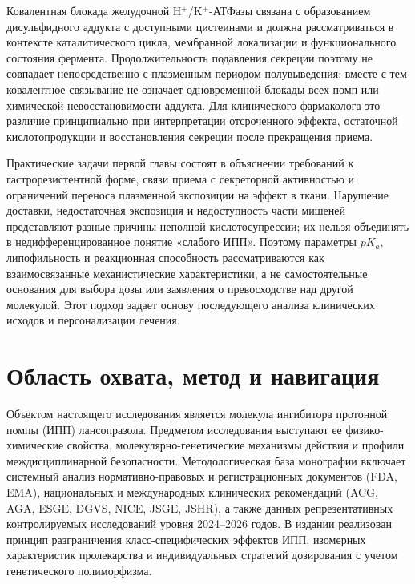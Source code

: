 \documentclass[11pt,a4paper,notitlepage]{report}
\newcommand{\src}[1]{\unskip\space\cite{#1}}
\begin{document}
Ковалентная блокада желудочной H$^+$/K$^+$-АТФазы связана с образованием дисульфидного аддукта с доступными цистеинами и должна рассматриваться в контексте каталитического цикла, мембранной локализации и функционального состояния фермента. Продолжительность подавления секреции поэтому не совпадает непосредственно с плазменным периодом полувыведения; вместе с тем ковалентное связывание не означает одновременной блокады всех помп или химической невосстановимости аддукта. Для клинического фармаколога это различие принципиально при интерпретации отсроченного эффекта, остаточной кислотопродукции и восстановления секреции после прекращения приема.\src{molstructure,molcys,molrestore,uslabel}

Практические задачи первой главы состоят в объяснении требований к гастрорезистентной форме, связи приема с секреторной активностью и ограничений переноса плазменной экспозиции на эффект в ткани. Нарушение доставки, недостаточная экспозиция и недоступность части мишеней представляют разные причины неполной кислотосупрессии; их нельзя объединять в недифференцированное понятие «слабого ИПП». Поэтому параметры $pK_a$, липофильность и реакционная способность рассматриваются как взаимосвязанные механистические характеристики, а не самостоятельные основания для выбора дозы или заявления о превосходстве над другой молекулой. Этот подход задает основу последующего анализа клинических исходов и персонализации лечения.\src{molchem,molnagaya90,molp450,acggerd,cpic}

\section{Область охвата, метод и навигация}
\label{sec:reading-guide}

Объектом настоящего исследования является молекула ингибитора протонной помпы (ИПП) лансопразола. Предметом исследования выступают ее физико-химические свойства, молекулярно-генетические механизмы действия и профили междисциплинарной безопасности. Методологическая база монографии включает системный анализ нормативно-правовых и регистрационных документов (FDA, EMA), национальных и международных клинических рекомендаций (ACG, AGA, ESGE, DGVS, NICE, JSGE, JSHR), а также данных репрезентативных контролируемых исследований уровня 2024--2026 годов.\src{uslabel,methodema2010,acghp,agapcab,esge2026,dgvs,nice,jgerd,jhp} В издании реализован принцип разграничения класс-специфических эффектов ИПП, изомерных характеристик пролекарства и индивидуальных стратегий дозирования с учетом генетического полиморфизма.\src{molchem,molcys,cpic}
\end{document}
